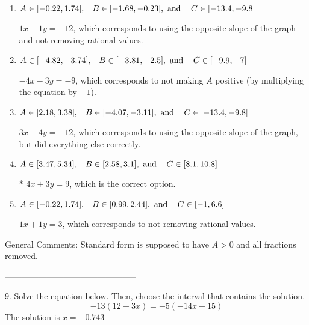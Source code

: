 \documentclass{extbook}[14pt]
\begin{document}
\begin{enumerate}[label=\Alph*.] 
\item $ A \in [-0.22, 1.74], \hspace{3mm} B \in [-1.68, -0.23], \text{ and } \hspace{3mm} C \in [-13.4, -9.8] $ 

  $1x - 1y = -12$, which corresponds to using the opposite slope of the graph and not removing rational values. 
\item $ A \in [-4.82, -3.74], \hspace{3mm} B \in [-3.81, -2.5], \text{ and } \hspace{3mm} C \in [-9.9, -7] $ 

  $-4x - 3y = -9$, which corresponds to not making $A$ positive (by multiplying the equation by $-1$). 
\item $ A \in [2.18, 3.38], \hspace{3mm} B \in [-4.07, -3.11], \text{ and } \hspace{3mm} C \in [-13.4, -9.8] $ 

  $3x - 4y = -12$, which corresponds to using the opposite slope of the graph, but did everything else correctly. 
\item $ A \in [3.47, 5.34], \hspace{3mm} B \in [2.58, 3.1], \text{ and } \hspace{3mm} C \in [8.1, 10.8] $ 

 * $4x + 3y = 9$, which is the correct option. 
\item $ A \in [-0.22, 1.74], \hspace{3mm} B \in [0.99, 2.44], \text{ and } \hspace{3mm} C \in [-1, 6.6] $ 

  $1x + 1y = 3$, which corresponds to not removing rational values. 
\end{enumerate} 
 
General Comments: Standard form is supposed to have $A > 0$ and all fractions removed.

-----------------------------------------------

9. Solve the equation below. Then, choose the interval that contains the solution.
\[ -13(12+3 x) = -5(-14 x+15) \] 
The solution is $ x = -0.743 $ 
\end{document}
